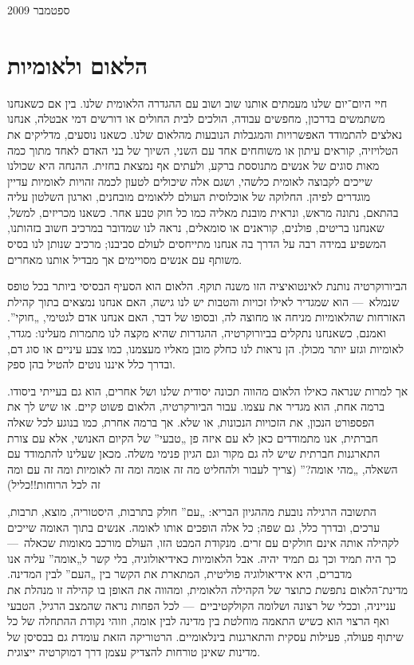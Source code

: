 ספטמבר 2009

\section*{הלאום ולאומיות}

חיי היום־יום שלנו מעמתים אותנו שוב ושוב עם ההגדרה הלאומית שלנו. בין אם כשאנחנו משתמשים בדרכון, מחפשים עבודה, הולכים לבית החולים או דורשים דמי אבטלה, אנחנו נאלצים להתמודד האפשרויות והמגבלות הנובעות מהלאום שלנו. כשאנו נוסעים, מדליקים את הטלויזיה, קוראים עיתון או משוחחים אחד עם השני, השיוך של בני האדם לאחד מתוך כמה מאות סוגים של אנשים מתנוססת ברקע, ולעתים אף נמצאת בחזית. ההנחה היא שכולנו שייכים לקבוצה לאומית כלשהי, ושגם אלה שיכולים לטעון לכמה זהויות לאומיות עדיין מוגדרים לפיהן. החלוקה של אוכלוסית העולם ללאומים מובחנים, וארגון השלטון עליה בהתאם, נתונה מראש, ונראית מובנת מאליה כמו כל חוק טבע אחר. כשאנו מכריזים, למשל, שאנחנו בריטים, פולנים, קוראנים או סומאלים, נראה לנו שמדובר במרכיב חשוב בזהותנו, המשפיע במידה רבה על הדרך בה אנחנו מתייחסים לעולם סביבנו; מרכיב שנותן לנו בסיס משותף עם אנשים מסויימים אך מבדיל אותנו מאחרים.

הביורוקרטיה נותנת לאינטואיציה הזו משנה תוקף. הלאום הוא הסעיף הבסיסי ביותר בכל טופס שנמלא~— הוא שמגדיר לאילו זכויות והטבות יש לנו גישה, האם אנחנו נמצאים בתוך קהילת האזרחות שהלאומיות מניחה או מחוצה לה, ובסופו של דבר, האם אנחנו אדם לגטימי, „חוקי”. ואמנם, כשאנחנו נתקלים בביורוקרטיה, ההגדרות שהיא מקצה לנו מתמרות מעלינו: מגדר, לאומיות וגזע יותר מכולן. הן נראות לנו כחלק מובן מאליו מעצמנו, כמו צבע עיניים או סוג דם, ובדרך כלל איננו נוטים להטיל בהן ספק.

אך למרות שנראה כאילו הלאום מהווה תכונה יסודית שלנו ושל אחרים, הוא גם בעייתי ביסודו. ברמה אחת, הוא מגדיר את עצמו. עבור הביורקרטיה, הלאום פשוט קיים. או שיש לך את הפספורט הנכון, את הזכויות הנכונות, או שלא. אך ברמה אחרת, כמו בנוגע לכל שאלה חברתית, אנו מתמודדים כאן לא עם איזה פן „טבעי” של הקיום האנושי, אלא עם צורת התארגנות חברתית שיש לה גם מקור וגם הגיון פנימי משלה. מכאן שעלינו להתמודד עם השאלה, „מהי אומה?” (צריך לעבור ולהחליט מה זה אומה ומה זה לאומיות ומה זה עם ומה זה לכל הרוחות!!כליל)

התשובה הרגילה נובעת מההגיון הבריא: „עם” חולק בתרבות, היסטוריה, מוצא, תרבות, ערכים, ובדרך כלל, גם שפה; כל אלה הופכים אותו לאומה. אנשים בתוך האומה שייכים לקהילה אותה אינם חולקים עם זרים. מנקודת המבט הזו, העולם מורכב מאומות שכאלה~— כך היה תמיד וכך גם תמיד יהיה. אבל הלאומיות כאידיאולוגיה, בלי קשר ל„אומה” עליה אנו מדברים, היא אידיאולוגיה פוליטית, המתארת את הקשר בין „העם” לבין המדינה. מדינת־הלאום נתפשת כתוצר של הקהילה הלאומית, ומהווה את האופן בו קהילה זו מנהלת את ענייניה, וככלי של רצונה ושלומה הקולקטיביים~— לכל הפחות נראה שהמצב הרגיל, הטבעי ואף הרצוי הוא כשיש התאמה מוחלטת בין מדינה לבין אומה, וזוהי נקודת ההתחלה של כל שיתוף פעולה, פעילות עסקית והתארגנות בינלאומיים. הרטוריקה הזאת עומדת גם בבסיסן של מדינות שאינן טורחות להצדיק עצמן דרך דמוקרטיה ייצוגית.

